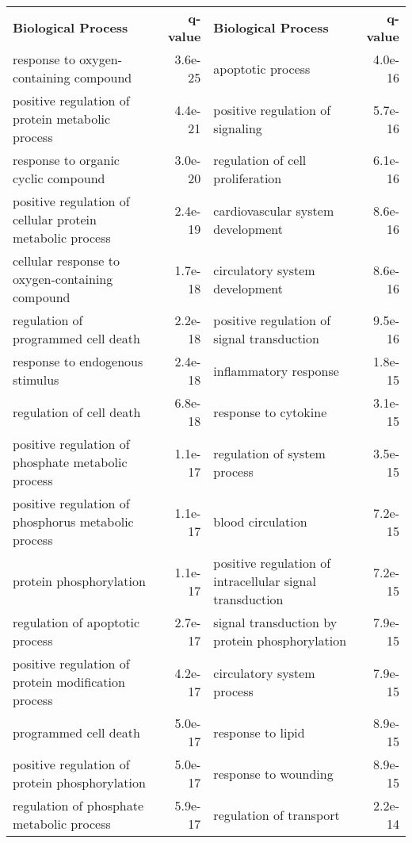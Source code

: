 \documentclass[fleqn,10pt]{SelfArx} %
\begin{document}
\begin{table}[ht]
	\centering
	\scriptsize
	\begin{tabularx}{\textwidth}{lRlR}
		\textbf{\color{white} Biological Process} & \textbf{\color{white} q-value} & \textbf{\color{white} Biological Process} & \textbf{\color{white} q-value}\\
		response to oxygen-containing compound & 3.6e-25 & apoptotic process & 4.0e-16 \\ 
		positive regulation of protein metabolic process & 4.4e-21 & positive regulation of signaling & 5.7e-16 \\ 
		response to organic cyclic compound & 3.0e-20 & regulation of cell proliferation & 6.1e-16 \\ 
		positive regulation of cellular protein metabolic process & 2.4e-19 & cardiovascular system development & 8.6e-16 \\ 
		cellular response to oxygen-containing compound & 1.7e-18 & circulatory system development & 8.6e-16 \\ 
		regulation of programmed cell death & 2.2e-18 & positive regulation of signal transduction & 9.5e-16 \\ 
		response to endogenous stimulus & 2.4e-18 & inflammatory response & 1.8e-15 \\ 
		regulation of cell death & 6.8e-18 & response to cytokine & 3.1e-15 \\ 
		positive regulation of phosphate metabolic process & 1.1e-17 & regulation of system process & 3.5e-15 \\ 
		positive regulation of phosphorus metabolic process & 1.1e-17 & blood circulation & 7.2e-15 \\ 
		protein phosphorylation & 1.1e-17 & positive regulation of intracellular signal transduction & 7.2e-15 \\ 
		regulation of apoptotic process & 2.7e-17 & signal transduction by protein phosphorylation & 7.9e-15 \\ 
		positive regulation of protein modification process & 4.2e-17 & circulatory system process & 7.9e-15 \\ 
		programmed cell death & 5.0e-17 & response to lipid & 8.9e-15 \\ 
		positive regulation of protein phosphorylation & 5.0e-17 & response to wounding & 8.9e-15 \\ 
		regulation of phosphate metabolic process & 5.9e-17 & regulation of transport & 2.2e-14 \\ 

\end{tabularx}
\end{table}
\end{document}
